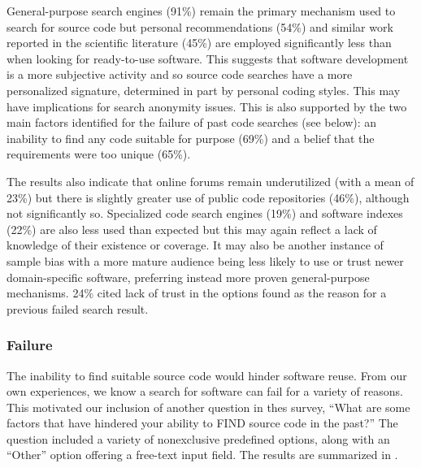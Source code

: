 \documentclass{casicswhitepaper}
\begin{document}

General-purpose search engines (91\%) remain the primary mechanism used to search for source code but personal recommendations (54\%) and similar work reported in the scientific literature (45\%) are employed significantly less than when looking for ready-to-use software. This suggests that software development is a more subjective activity and so source code searches have a more personalized signature, determined in part by personal coding styles. This may have implications for search anonymity issues. This is also supported by the two main factors identified for the failure of past code searches (see below): an inability to find any code suitable for purpose (69\%) and a belief that the requirements were too unique (65\%).

The results also indicate that online forums remain underutilized (with a mean of 23\%) but there is slightly greater use of public code repositories (46\%), although not significantly so. Specialized code search engines (19\%) and software indexes (22\%) are also less used than expected but this may again reflect a lack of knowledge of their existence or coverage. It may also be another instance of sample bias with a more mature audience being less likely to use or trust newer domain-specific software, preferring instead more proven general-purpose mechanisms.  24\% cited lack of trust in the options found as the reason for a previous failed search result.


\subsubsection{Failure}

The inability to find suitable source code would hinder software reuse.  From our own experiences, we know a search for software can fail for a variety of reasons.  This motivated our inclusion of another question in thes survey, ``What are some factors that have hindered your ability to FIND source code in the past?''  The question included a variety of nonexclusive predefined options, along with an ``Other'' option offering a free-text input field.  The results are summarized in .
\end{document}
